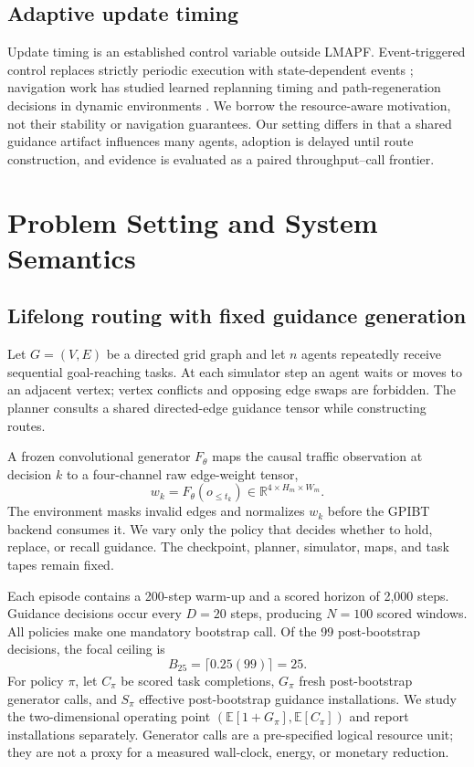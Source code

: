 \documentclass[sigconf,anonymous,review]{acmart}
\begin{document}
\subsection{Adaptive update timing}

Update timing is an established control variable outside LMAPF. Event-triggered
control replaces strictly periodic execution with state-dependent events
\cite{tabuada2007event}; navigation work has studied learned replanning timing
and path-regeneration decisions in dynamic environments
\cite{honda2024when,han2018path}. We borrow the resource-aware motivation, not
their stability or navigation guarantees. Our setting differs in that a shared
guidance artifact influences many agents, adoption is delayed until route
construction, and evidence is evaluated as a paired throughput--call frontier.

\section{Problem Setting and System Semantics}

\subsection{Lifelong routing with fixed guidance generation}

Let $G=(V,E)$ be a directed grid graph and let $n$ agents repeatedly receive
sequential goal-reaching tasks. At each simulator step an agent waits or moves
to an adjacent vertex; vertex conflicts and opposing edge swaps are forbidden.
The planner consults a shared directed-edge guidance tensor while constructing
routes.

A frozen convolutional generator $F_\theta$ maps the causal traffic
observation at decision $k$ to a four-channel raw edge-weight tensor,
\begin{equation}
  w_k=F_\theta(o_{\leq t_k})\in\mathbb{R}^{4\times H_m\times W_m}.
\end{equation}
The environment masks invalid edges and normalizes $w_k$ before the GPIBT
backend consumes it. We vary only the policy that decides whether to hold,
replace, or recall guidance. The checkpoint, planner, simulator, maps, and task
tapes remain fixed.

Each episode contains a 200-step warm-up and a scored horizon of 2,000 steps.
Guidance decisions occur every $D=20$ steps, producing $N=100$ scored windows.
All policies make one mandatory bootstrap call. Of the 99 post-bootstrap
decisions, the focal ceiling is
\begin{equation}
  B_{25}=\lceil0.25(99)\rceil=25.
\end{equation}
For policy $\pi$, let $C_\pi$ be scored task completions, $G_\pi$ fresh
post-bootstrap generator calls, and $S_\pi$ effective post-bootstrap guidance
installations. We study the two-dimensional operating point
$(\mathbb{E}[1+G_\pi],\mathbb{E}[C_\pi])$ and report installations separately.
Generator calls are a pre-specified logical resource unit; they are not a proxy
for a measured wall-clock, energy, or monetary reduction.
\end{document}
